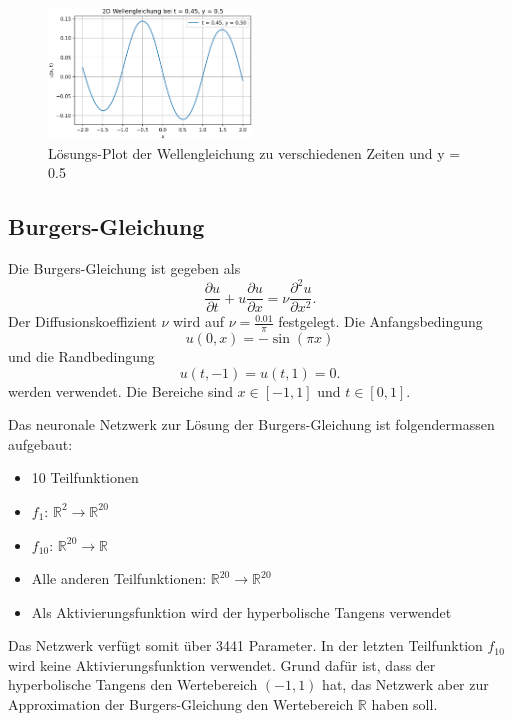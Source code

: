 \begin{figure}
    \includegraphics[width=0.48\textwidth]{papers/neuronal/images/wave_solution_t045.png}
    \caption{Lösungs-Plot der Wellengleichung zu verschiedenen Zeiten und y = 0.5}\label{fig:loesung_wellen_fix_yt}
\end{figure}

\subsection{Burgers-Gleichung}\label{neuronal:subsection:burgers_gleichung}
Die Burgers-Gleichung ist gegeben als
\begin{equation}
    \frac{\partial u}{\partial t} + u \frac{\partial u}{\partial x} = \nu \frac{\partial^2 u}{\partial x^2}.
    \label{neuronal:burgers}
\end{equation}
Der Diffusionskoeffizient \( \nu \) wird auf \( \nu = \frac{0.01}{\pi} \) festgelegt.
Die Anfangsbedingung
\begin{equation}
    u(0, x) = - \sin(\pi x)
    \label{neuronal:burgers_anfang}
\end{equation}
und die Randbedingung
\begin{equation}
    u(t, -1) = u(t, 1) = 0.
    \label{neuronal:burgers_rand}
\end{equation}
werden verwendet.
Die Bereiche sind \( x \in [-1,1] \) und \( t \in [0,1] \).

Das neuronale Netzwerk zur Lösung der Burgers-Gleichung ist folgendermassen aufgebaut:
\begin{itemize}
    \item 10 Teilfunktionen
    \item \( f_1 \): \( \mathbb{R}^2 \longrightarrow \mathbb{R}^{20} \) 
    \item \( f_{10} \): \( \mathbb{R}^{20} \longrightarrow \mathbb{R} \)
    \item Alle anderen Teilfunktionen: \( \mathbb{R}^{20} \longrightarrow \mathbb{R}^{20} \)
    \item Als Aktivierungsfunktion wird der hyperbolische Tangens verwendet
\end{itemize}
Das Netzwerk verfügt somit über 3441 Parameter.
In der letzten Teilfunktion \( f_{10} \) wird keine Aktivierungsfunktion verwendet.
Grund dafür ist, dass der hyperbolische Tangens den Wertebereich \((-1, 1)\) hat, das Netzwerk aber zur Approximation der Burgers-Gleichung den Wertebereich \( \mathbb{R} \) haben soll.

